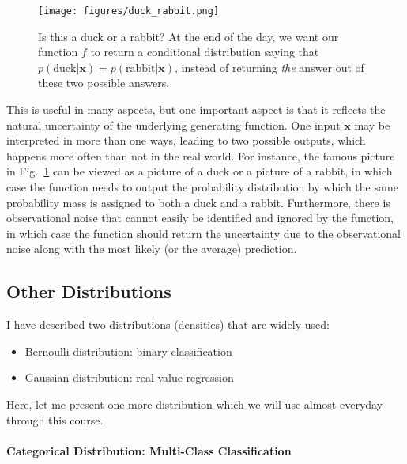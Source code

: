 \documentclass{report}
\newcommand{\vect}[1]{\mathbf{#1}}
\newcommand{\vx}[0]{\vect{x}}
\begin{document}
\begin{figure}[ht]
    \centering
    \begin{minipage}{0.6\textwidth}
        \texttt{[image: figures/duck\_rabbit.png]}
    \end{minipage}
    \hfill
    \begin{minipage}{0.39\textwidth}
        \caption{Is this a duck or a rabbit? \cite{kuhn2012structure} At the end
        of the day, we want our function $f$ to return a conditional
    distribution saying that $p(\text{duck}|\vx) = p(\text{rabbit}|\vx)$,
instead of returning {\em the} answer out of these two possible answers.}
        \label{fig:duck_rabbit}
    \end{minipage}
\end{figure}

This is useful in many aspects, but one important aspect is that it reflects the
natural uncertainty of the underlying generating function. One input $\vx$ may
be interpreted in more than one ways, leading to two possible outputs, which
happens more often than not in the real world. For instance, the famous picture
in Fig.~\ref{fig:duck_rabbit} can be viewed as a picture of a duck or a picture
of a rabbit, in which case the function needs to output the probability
distribution by which the same probability mass is assigned to both a duck and a
rabbit. Furthermore, there is observational noise that cannot easily be
identified and ignored by the function, in which case the function should return
the uncertainty due to the observational noise along with the most likely (or
the average) prediction.

\subsection{Other Distributions}
\label{sec:other_dist}

I have described two distributions (densities) that are widely used: 
\begin{itemize}
    \itemsep 0em
    \item Bernoulli distribution: binary classification
    \item Gaussian distribution: real value regression
\end{itemize}
Here, let me present one more distribution which we will use almost everyday
through this course.

\paragraph{Categorical Distribution: Multi-Class Classification}
\end{document}
